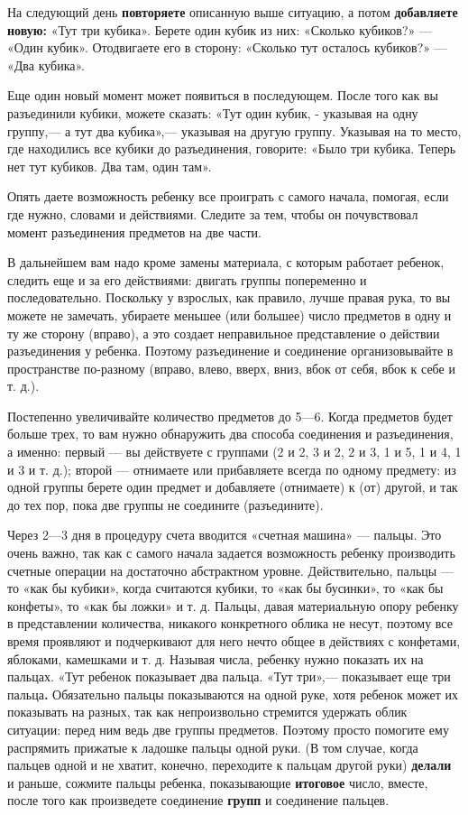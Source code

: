 \documentclass[a5paper]{book}
\begin{document}
На следующий день \textbf{повторяете} описанную выше ситуацию, а потом
\textbf{добавляете новую:} «Тут три кубика». Берете один кубик из них:
«Сколько кубиков?» --- «Один кубик». Отодвигаете его в сторону: «Сколько
тут осталось кубиков?» --- «Два кубика».

Еще один новый момент может появиться в последующем. После того как вы
разъединили кубики, можете сказать: «Тут один кубик, - указывая на одну
группу,--- а тут два кубика»,--- указывая на другую группу. Указывая на
то место, где находились все кубики до разъединения, говорите: «Было три
кубика. Теперь нет тут кубиков. Два там, один там».

Опять даете возможность ребенку все проиграть с самого начала, помогая,
если где нужно, словами и действиями. Следите за тем, чтобы он
почувствовал момент разъединения предметов на две части.

В дальнейшем вам надо кроме замены материала, с которым работает
ребенок, следить еще и за его действиями: двигать группы попеременно и
последовательно. Поскольку у взрослых, как правило, лучше правая рука,
то вы можете не замечать, убираете меньшее (или большее) число предметов
в одну и ту же сторону (вправо), а это создает неправильное
представление о действии разъединения у ребенка. Поэтому разъединение и
соединение организовывайте в пространстве по-разному (вправо, влево,
вверх, вниз, вбок от себя, вбок к себе и т. д.).

Постепенно увеличивайте количество предметов до 5---6. Когда предметов
будет больше трех, то вам нужно обнаружить два способа соединения и
разъединения, а именно: первый --- вы действуете с группами (2 и 2, 3 и
2, 2 и 3, 1 и 5, 1 и 4, 1 и 3 и т. д.); второй --- отнимаете или
прибавляете всегда по одному предмету: из одной группы берете один
предмет и добавляете (отнимаете) к (от) другой, и так до тех пор, пока
две группы не соедините (разъедините).

Через 2---3 дня в процедуру счета вводится «счетная машина» --- пальцы.
Это очень важно, так как с самого начала задается возможность ребенку
производить счетные операции на достаточно абстрактном уровне.
Действительно, пальцы --- то «как бы кубики», когда считаются кубики, то
«как бы бусинки», то «как бы конфеты», то «как бы ложки» и т. д. Пальцы,
давая материальную опору ребенку в представлении количества, никакого
конкретного облика не несут, поэтому все время проявляют и подчеркивают
для него нечто общее в действиях с конфетами, яблоками, камешками и т.
д. Называя числа, ребенку нужно показать их на пальцах. «Тут ребенок
показывает два пальца. «Тут три»,--- показывает еще три пальца\textbf{.}
Обязательно пальцы показываются на одной руке, хотя ребенок может их
показывать на разных, так как непроизвольно стремится удержать облик
ситуации: перед ним ведь две группы предметов. Поэтому просто помогите
ему распрямить прижатые к ладошке пальцы одной руки. (В том случае,
когда пальцев одной и не хватит, конечно, переходите к пальцам другой
руки) \textbf{делали} и раньше, сожмите пальцы ребенка, показывающие
\textbf{итоговое} число, вместе, после того как произведете соединение
\textbf{групп} и соединение пальцев.
\end{document}
